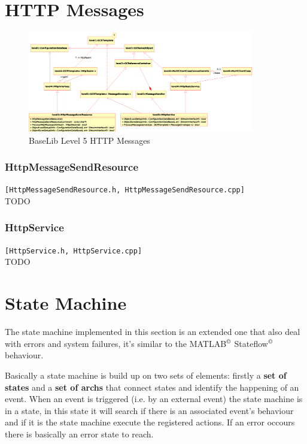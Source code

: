 \section{HTTP Messages}

\begin{figure}[h!]
 \begin{center}
  \includegraphics[width=0.88\textwidth]{level5/level5-HTTP.eps} 
  \caption{BaseLib Level 5 HTTP Messages}
  \label{f:level5:MSGHTTP}
 \end{center}
\end{figure}

\subsubsection{HttpMessageSendResource}
\texttt{[HttpMessageSendResource.h, HttpMessageSendResource.cpp]}\\
TODO

\subsubsection{HttpService}
\texttt{[HttpService.h, HttpService.cpp]}\\
TODO



\section{State Machine}
The state machine implemented in this section is an extended one that also deal with errors and system failures, it's similar to the MATLAB$^\copyright$ Stateflow$^\copyright$ behaviour.

Basically a state machine is build up on two sets of elements: firstly a \textbf{set of states} and a \textbf{set of archs} that connect states and identify the happening of an event. When an event is triggered (i.e. by an external event) the state machine is in a state, in this state it will search if there is an associated event's behaviour and if it is the state machine execute the registered actions. If an error occours there is basically an error state to reach.

